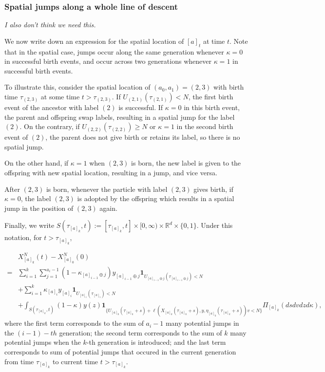 \documentclass[12pt]{article}
\newcommand{\IR}{\mathbb R}
\newcommand{\ind}{\mathbf{1}}
\newcommand{\concat}{\oplus}   %
\newcommand{\comment}[1]{{\color{blue} \it #1}}
\begin{document}
\subsubsection{Spatial jumps along a whole line of descent}

\comment{I also don't think we need this.}

We now write down an expression for the
spatial location of $[a]_t$ at time $t$.
Note that in the spatial case,
jumps occur along the same generation
whenever $\kappa = 0$ in successful birth events,
and occur across two generations
whenever $\kappa = 1$ in successful birth
events.

To illustrate this, consider the spatial location of $(a_0,a_1)=(2,3)$ with birth time $\tau_{(2,3)}$ at some time $t>\tau_{(2,3)}$.
If $U_{(2,1)}(\tau_{(2,1)}) < N$,
the first birth event of the ancestor
with label $(2)$
is successful.
If $\kappa = 0$ in this birth event,
the parent and offspring swap labels,
resulting in
a spatial jump for the label $(2)$.
On the contrary, 
if $U_{(2,2)}(\tau_{(2,2)}) \geq N$
or $\kappa = 1$
in the second birth event of $(2)$,
the parent does not give birth
or retains its label,
so there is no spatial jump.

On the other hand, 
if $\kappa=1$ when $(2,3)$ is born,
the new label is given to
the offspring
with new spatial location,
resulting in a jump,
and vice versa.

After $(2,3)$ is born,
whenever the particle with label
$(2,3)$ gives birth, 
if $\kappa = 0$, the label $(2,3)$
is adopted by the offspring
which results in a spatial jump
in the position of $(2,3)$
again. 

Finally, we write $S(\tau_{[a]_k},t):=[\tau_{[a]_k},t]\times[0,\infty)\times\IR^d \times \{0,1\}$.
Under this notation, for $t>\tau_{[a]_k}$,


\begin{equation}
\label{eq: space_across_lineage}
\begin{aligned}
&X^{N}_{[a]_{k}}(t)- X^{N}_{[a]_{0}}(0)\\
=& \sum_{i=1}^{k}
\sum_{j=1}^{a_i-1}
(1-\kappa_{[a]_{i-1}\concat j}) y_{[a]_{i-1}\concat j} \ind_{U_{[a]_{i-1}\concat j}(\tau_{[a]_{i-1}\concat j}) < N}\\
&+ \sum_{i=1}^{k}
\kappa_{[a]_i} y_{[a]_i} \ind_{U_{[a]_i}(\tau_{[a]_i}) < N}\\
&+\int_{S(\tau_{[a]_k},t)}
(1-\kappa)y(z)
\ind_{ \{
        U_{[a]_k}(\tau_{[a]_k}+s)
        + \ell(X_{[a]_k}(\tau_{[a]_k}+s),y,\eta_{[a]_k}(\tau_{[a]_k}+s)) v < N
        \}
      } 
\Pi_{[a]_k}(dsdvdzd\kappa),
\end{aligned}    
\end{equation}
where the first term
corresponds to 
the sum of $a_{i}-1$ many potential jumps
in the $(i-1)-th$ generation;
the second term corresponds to 
the sum of $k$ many potential jumps
when the $k$-th generation is introduced;
and the last term
corresponds to sum of 
potential jumps that occured in
the current generation from 
time $\tau_{[a]_k}$
to current time $t >\tau_{[a]_k}$.
\end{document}
